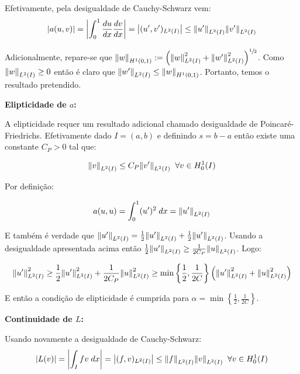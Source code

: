 \documentclass{article}
\theoremstyle{definition}
\theoremstyle{plain}
\numberwithin{equation}{section}
\begin{document}
Efetivamente, pela desigualdade de Cauchy-Schwarz vem:
\begin{equation*}
     \abs{a(u,v)}=\abs{\int^1_0\frac{du}{dx}\frac{dv}{dx}}=\abs{(u',v')_{L^2(I)}} \leq \norm{u'}_{L^2(I)}\norm{v'}_{L^2(I)}
\end{equation*}

Adicionalmente, repare-se que $\norm{w}_{H^1(0,1)}:=\left(\norm{w}^2_{L^2(I)}+\norm{w'}^2_{L^2(I)}\right)^{\sfrac{1}{2}}$. Como $\norm{w}_{L^2(I)} \geq 0$ então é claro que $\norm{w'}_{L^2(I)} \leq \norm{w}_{H^1(0,1)}$. Portanto, temos o resultado pretendido.

\vspace{1mm}

\textbf{Elipticidade de $a$:}

A elipticidade requer um resultado adicional chamado desigualdade de Poincaré-Friedrichs. Efetivamente dado $I=(a,b)$ e definindo $s=b-a$ então existe uma constante $C_P>0$ tal que:

\begin{equation*}
    \norm{v}_{L^2(I)} \leq C_P \norm{v'} _{L^2(I)}  \; \; \forall v \in H^1_{0}(I)
\end{equation*}

Por definição:

\begin{equation*}
    a(u,u)=\int^1_0 (u')^2 \; dx = \norm{u'}_{L^2(I)}
\end{equation*}

E também é verdade que $\norm{u'}_{L^2(I)}=\frac{1}{2}\norm{u'}_{L^2(I)}+\frac{1}{2}\norm{u'}_{L^2(I)}$. Usando a desigualdade apresentada acima então $\frac{1}{2}\norm{u'} _{L^2(I)} \geq \frac{1}{2C_P}\norm{u}_{L^2(I)} $. Logo:

\begin{equation*}
 \norm{u'}^2_{L^2(I)} \geq \frac{1}{2}\norm{u'}^2_{L^2(I)} + \frac{1}{2C_P}\norm{u}^2_{L^2(I)} \geq \min\left\{{\frac{1}{2},\frac{1}{2C}}\right\}\left(\norm{u'}^2_{L^2(I)} + \norm{u}^2_{L^2(I)}\right)
\end{equation*}

E então a condição de elipticidade é cumprida para $\alpha=\min\left\{{\frac{1}{2},\frac{1}{2C}}\right\}$.

\vspace{1mm}

\textbf{Continuidade de $L$:}

Usando novamente a desigualdade de Cauchy-Schwarz:
\begin{equation*}
    \abs{L(v)}=\abs{\int_I fv \; dx}=\abs{(f,v)_{L^2(I)}} \leq \norm{f}_{L^2(I)} \norm{v}_{L^2(I)} \; \;\forall v \in H^1_0(I)
\end{equation*}
\end{document}
